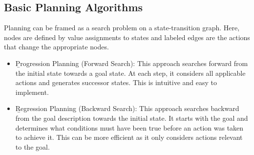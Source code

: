 \subsection{Basic Planning Algorithms}
Planning can be framed as a search problem on a state-transition graph. Here, nodes are defined by value assignments to states and labeled edges are the actions that change the appropriate nodes.
\begin{itemize}
    \item \b{Progression Planning (Forward Search):} This approach searches forward from the initial state towards a goal state. At each step, it considers all applicable actions and generates successor states. This is intuitive and easy to implement.
    \item \b{Regression Planning (Backward Search):} This approach searches backward from the goal description towards the initial state. It starts with the goal and determines what conditions must have been true before an action was taken to achieve it. This can be more efficient as it only considers actions relevant to the goal.
\end{itemize}

